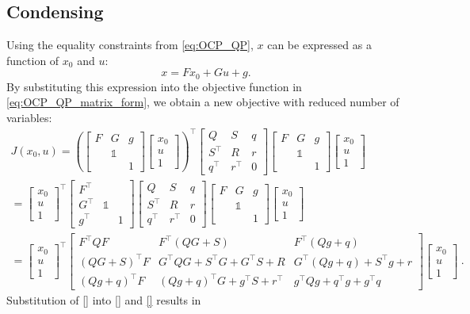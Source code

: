 \documentclass[a4paper]{article}
\newcommand{\I}{\mathbb{1}}
\newcommand{\bbmat}{\begin{bmatrix}}
\newcommand{\ebmat}{\end{bmatrix}}
\begin{document}
\subsection{Condensing}
Using the equality constraints from \eqref{eq:OCP_QP}, $x$ can be expressed as a function of $x_0$ and $u$:
\begin{equation}
	x = F x_0 + G u + g.
\end{equation}
By substituting this expression into the objective function in \eqref{eq:OCP_QP_matrix_form}, we obtain a new objective with reduced number of variables:
\begin{multline}
	J(x_0,u) = \left(\bbmat F & G & g \\ & \I \\ && 1 \ebmat \bbmat x_0 \\ u \\ 1 \ebmat\right)^\top 
	\bbmat Q & S & q \\ S^\top & R & r \\ q^\top & r^\top & 0 \ebmat
	\bbmat F & G & g \\ & \I \\ && 1 \ebmat \bbmat x_0 \\ u \\ 1 \ebmat\\
	= \bbmat x_0 \\ u \\ 1 \ebmat^\top 
	\bbmat F^\top \\ G^\top & \I \\ g^\top && 1 \ebmat
	\bbmat Q & S & q \\ S^\top & R & r \\ q^\top & r^\top & 0 \ebmat
	\bbmat F & G & g \\ & \I \\ && 1 \ebmat 
	\bbmat x_0 \\ u \\ 1 \ebmat\\
	= \bbmat x_0 \\ u \\ 1 \ebmat^\top 
	\bbmat 
		F^\top QF & F^\top (QG + S) & F^\top(Qg + q) \\ 
		(QG + S)^\top F & G^\top Q G + S^\top G + G^\top S + R & G^\top (Qg + q) + S^\top g + r \\ 
		(Qg + q)^\top F & (Qg + q)^\top G + g^\top S + r^\top & g^\top Q g + q^\top g + g^\top q 
	\ebmat
	\bbmat x_0 \\ u \\ 1 \ebmat\ .
\end{multline}
Substitution of \eqref{} into \eqref{} and \eqref{} results in
\end{document}
